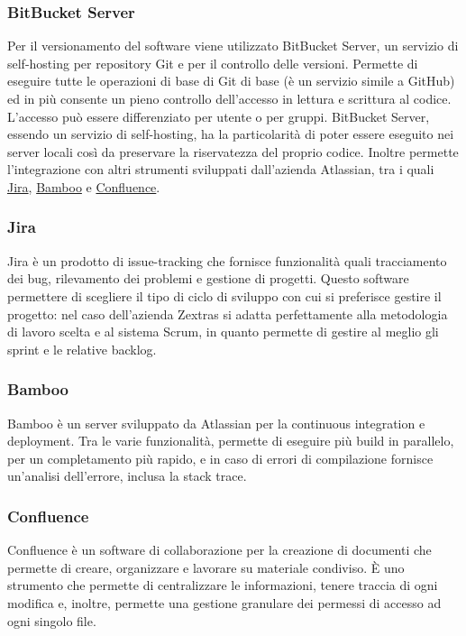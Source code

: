 \subsubsection{BitBucket Server}
Per il versionamento del software viene utilizzato BitBucket Server, un servizio di self-hosting per repository Git e per il controllo delle versioni. Permette di eseguire tutte le operazioni di base di Git di base (è un servizio simile a GitHub) ed in più consente un pieno controllo dell'accesso in lettura e scrittura al codice. L'accesso può essere differenziato per utente o per gruppi. BitBucket Server, essendo un servizio di self-hosting, ha la particolarità di poter essere eseguito nei server locali così da preservare la riservatezza del proprio codice. Inoltre permette l'integrazione con altri strumenti sviluppati dall'azienda Atlassian, tra i quali \hyperref[subsubsec:jira]{Jira}, \hyperref[subsubsec:bamboo]{Bamboo} e \hyperref[subsubsec:confluence]{Confluence}.
\subsubsection{Jira}\label{subsubsec:jira}
Jira è un prodotto di issue-tracking che fornisce funzionalità quali tracciamento dei bug, rilevamento dei problemi e gestione di progetti. Questo software permettere di scegliere il tipo di ciclo di sviluppo con cui si preferisce gestire il progetto: nel caso dell'azienda Zextras si adatta perfettamente alla metodologia di lavoro scelta e al sistema Scrum, in quanto permette di gestire al meglio gli sprint e le relative backlog.
\subsubsection{Bamboo}\label{subsubsec:bamboo}
Bamboo è un server sviluppato da Atlassian per la continuous integration e deployment. Tra le varie funzionalità, permette di eseguire più build in parallelo, per un completamento più rapido, e in caso di errori di compilazione fornisce un'analisi dell'errore, inclusa la stack trace.
\subsubsection{Confluence}\label{subsubsec:confluence}
Confluence è un software di collaborazione per la creazione di documenti che permette di creare, organizzare e lavorare su materiale condiviso. È uno strumento che permette di centralizzare le informazioni, tenere traccia di ogni modifica e, inoltre, permette una gestione granulare dei permessi di accesso ad ogni singolo file.

